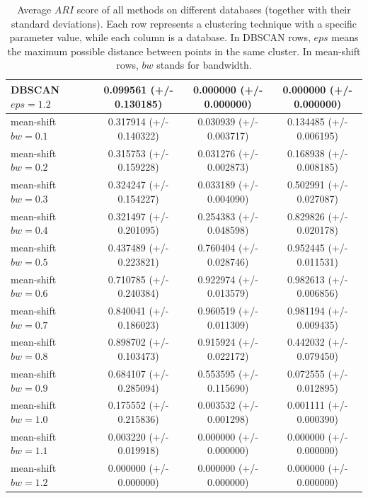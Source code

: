 \documentclass[conference]{IEEEtran}
\begin{document}
\begin{table}[t]
\begin{tabular}{ | l*{4}{c} | }
    DBSCAN $eps = 1.2$   & \vline & 0.099561 (+/- 0.130185) & 0.000000 (+/- 0.000000) & 0.000000 (+/- 0.000000) \\
    \hline
    mean-shift $bw =0.1$ & \vline & 0.317914 (+/- 0.140322) & 0.030939 (+/- 0.003717) & 0.134485 (+/- 0.006195) \\
    mean-shift $bw =0.2$ & \vline & 0.315753 (+/- 0.159228) & 0.031276 (+/- 0.002873) & 0.168938 (+/- 0.008185) \\
    mean-shift $bw =0.3$ & \vline & 0.324247 (+/- 0.154227) & 0.033189 (+/- 0.004090) & 0.502991 (+/- 0.027087) \\
    mean-shift $bw =0.4$ & \vline & 0.321497 (+/- 0.201095) & 0.254383 (+/- 0.048598) & 0.829826 (+/- 0.020178) \\
    mean-shift $bw =0.5$ & \vline & 0.437489 (+/- 0.223821) & 0.760404 (+/- 0.028746) & 0.952445 (+/- 0.011531) \\
    mean-shift $bw =0.6$ & \vline & 0.710785 (+/- 0.240384) & 0.922974 (+/- 0.013579) & 0.982613 (+/- 0.006856) \\
    mean-shift $bw =0.7$ & \vline & 0.840041 (+/- 0.186023) & 0.960519 (+/- 0.011309) & 0.981194 (+/- 0.009435) \\
    mean-shift $bw =0.8$ & \vline & 0.898702 (+/- 0.103473) & 0.915924 (+/- 0.022172) & 0.442032 (+/- 0.079450) \\
    mean-shift $bw =0.9$ & \vline & 0.684107 (+/- 0.285094) & 0.553595 (+/- 0.115690) & 0.072555 (+/- 0.012895) \\
    mean-shift $bw =1.0$ & \vline & 0.175552 (+/- 0.215836) & 0.003532 (+/- 0.001298) & 0.001111 (+/- 0.000390) \\
    mean-shift $bw =1.1$ & \vline & 0.003220 (+/- 0.019918) & 0.000000 (+/- 0.000000) & 0.000000 (+/- 0.000000) \\
    mean-shift $bw =1.2$ & \vline & 0.000000 (+/- 0.000000) & 0.000000 (+/- 0.000000) & 0.000000 (+/- 0.000000) \\
    \hline
  \end{tabular}
  \caption{Average $ARI$ score of all methods on different databases (together with their standard deviations). Each row represents a clustering technique with a specific parameter value, while each column is a database. In DBSCAN rows, $eps$ means the maximum possible distance between points in the same cluster. In mean-shift rows, $bw$ stands for bandwidth. }
  \label{scores_table}
\end{table}
\end{document}
